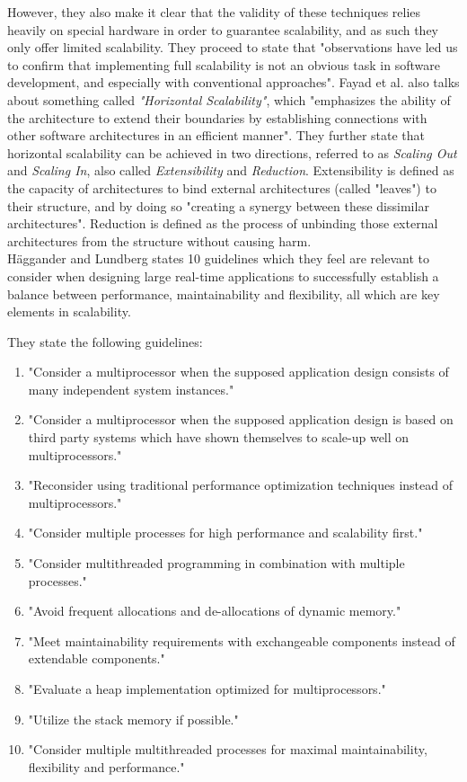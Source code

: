 \documentclass{article}
\begin{document}
{However, they also make it clear that the validity of these techniques relies
heavily on special hardware in order to guarantee scalability, and as such they
only offer limited scalability. They proceed to state that "observations have led
us to confirm that implementing full scalability is not an obvious task in software
development, and especially with conventional approaches".
Fayad et al. also talks about something called \emph{"Horizontal Scalability"},
which "emphasizes the ability of the architecture to extend their boundaries by
establishing connections with other software architectures in an efficient
manner".  They further state that horizontal scalability can be achieved in two
directions, referred to as \emph{Scaling Out} and \emph{Scaling In}, also
called \emph{Extensibility} and \emph{Reduction}.  Extensibility is defined as
the capacity of architectures to bind external architectures (called "leaves")
to their structure, and by doing so "creating a synergy between these
dissimilar architectures".  Reduction is defined as the process of unbinding
those external architectures from the structure without causing harm.
\\

Häggander and Lundberg\cite{haggander1999guidelines} states 10 guidelines which
they feel are relevant to consider when designing large real-time applications
to successfully establish a balance between performance, maintainability and
flexibility, all which are key elements in scalability. 

They state the following guidelines:
\begin{enumerate}
\item{"Consider a multiprocessor when the supposed application design consists
of many independent system instances."}
\item{"Consider a multiprocessor when the supposed application design is based on
third party systems which have shown themselves to scale-up well on 
multiprocessors."}
\item{"Reconsider using traditional performance optimization techniques instead
of multiprocessors."}
\item{"Consider multiple processes for high performance and scalability first."}
\item{"Consider multithreaded programming in combination with multiple processes."}
\item{"Avoid frequent allocations and de-allocations of dynamic memory."}
\item{"Meet maintainability requirements with exchangeable components instead
 of extendable components."}
\item{"Evaluate a heap implementation optimized for multiprocessors."}
\item{"Utilize the stack memory if possible."}
\item{"Consider multiple multithreaded processes for maximal maintainability, 
flexibility and performance."}
\end{enumerate}

}
\end{document}
